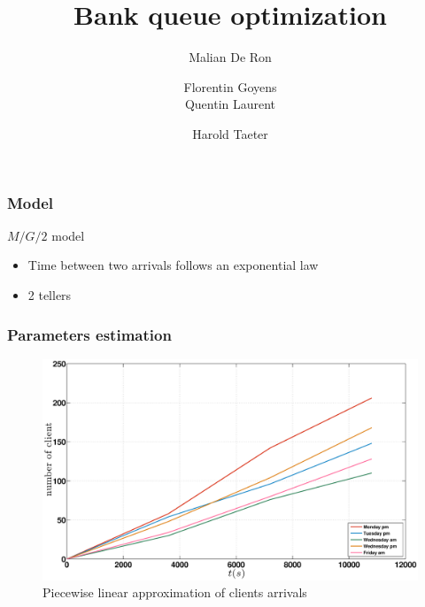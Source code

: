 \documentclass[10pt]{beamer}
\title{Bank queue optimization}
\author[Malian DR, Florentin G, Quentin L, Harlod T]{
  \small
  Malian De Ron
  \and
  Florentin Goyens
  \\
  Quentin Laurent
  \and
  Harold Taeter
}
\begin{document}
\begin{frame}
  \maketitle
\end{frame}

\begin{frame}
  \frametitle{Model}
  \begin{block}{$M/G/2$ model}
  \begin{itemize}
    \item Time between two arrivals follows an exponential law
    \item 2 tellers
    \end{itemize}
  \end{block}
\end{frame}


\begin{frame}
	\frametitle{Parameters estimation}

\begin{figure}
\centering
\includegraphics[width = \textwidth]{../report/images/lambdaApprox.eps}
\caption{Piecewise linear approximation of clients arrivals}
\end{figure}

\end{frame}
\end{document}
